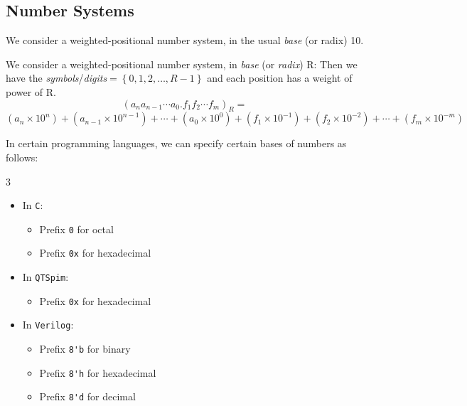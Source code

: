 \subsection{Number Systems}
We consider a weighted-positional number system, in the usual \textit{base} (or
radix) 10.
\begin{definition}
  We consider a weighted-positional number system, in \textit{base} (or \textit{radix}) R:\@
  Then we have the \textit{symbols}/\textit{digits}$=\left\{ 0,1,2,\ldots,R-1 \right\}$
  and each position has a weight of power of R.
  \[{\left( a_{n}a_{n-1}\cdots a_0.f_1f_2\cdots f_m \right)}_R=\]
  \[(a_{n}\times 10^{n})+(a_{n-1}\times 10^{n-1})+\cdots+(a_0\times 10^{0})+(f_1\times 10^{-1})+(f_2\times 10^{-2})+\cdots+(f_m\times 10^{-m})\]
\end{definition}
\begin{notation}
  In certain programming languages, we can specify certain bases of numbers as follows:
  \begin{multicols}{3}
    \begin{itemize}
      \item In \verb|C|:
      \begin{itemize}
        \item Prefix \verb|0| for octal
        \item Prefix \verb|0x| for hexadecimal
      \end{itemize}
      \vfill\null%
      \columnbreak%
    \item In \verb|QTSpim|:
      \begin{itemize}
        \item Prefix \verb|0x| for hexadecimal
      \end{itemize}
      \vfill\null%
      \columnbreak%
    \item In \verb|Verilog|:
      \begin{itemize}
        \item Prefix \verb|8'b| for binary
        \item Prefix \verb|8'h| for hexadecimal
        \item Prefix \verb|8'd| for decimal
      \end{itemize}
    \end{itemize}
  \end{multicols}
\end{notation}
